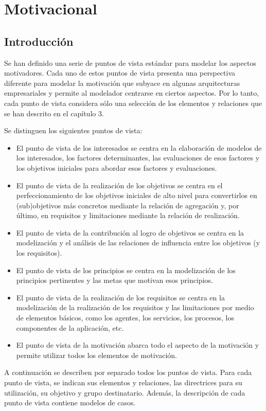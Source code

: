 \chapter{Motivacional}
\label{chap:Motivacional}
\section{Introducción}
Se han definido una serie de puntos de vista estándar para modelar los aspectos motivadores. Cada uno de estos puntos de vista presenta una perspectiva diferente para modelar la motivación que subyace en algunas arquitecturas empresariales y permite al modelador centrarse en ciertos aspectos. Por lo tanto, cada punto de vista considera sólo una selección de los elementos y relaciones que se han descrito en el capítulo 3.

Se distinguen los siguientes puntos de vista:

\begin{itemize}
	\item El punto de vista de los interesados se centra en la elaboración de modelos de los interesados, los factores determinantes, las evaluaciones de esos factores y los objetivos iniciales para abordar esos factores y evaluaciones.
	\item El punto de vista de la realización de los objetivos se centra en el perfeccionamiento de los objetivos iniciales de alto nivel para convertirlos en (sub)objetivos más concretos mediante la relación de agregación y, por último, en requisitos y limitaciones mediante la relación de realización.
	\item El punto de vista de la contribución al logro de objetivos se centra en la modelización y el análisis de las relaciones de influencia entre los objetivos (y los requisitos).
	\item El punto de vista de los principios se centra en la modelización de los principios pertinentes y las metas que motivan esos principios.
	\item El punto de vista de la realización de los requisitos se centra en la modelización de la realización de los requisitos y las limitaciones por medio de elementos básicos, como los agentes, los servicios, los procesos, los componentes de la aplicación, etc.
	\item El punto de vista de la motivación abarca todo el aspecto de la motivación y permite utilizar todos los elementos de motivación.
\end{itemize}

A continuación se describen por separado todos los puntos de vista. Para cada punto de vista, se indican sus elementos y relaciones, las directrices para su utilización, su objetivo y grupo destinatario. Además, la descripción de cada punto de vista contiene modelos de casos.
\newpage

